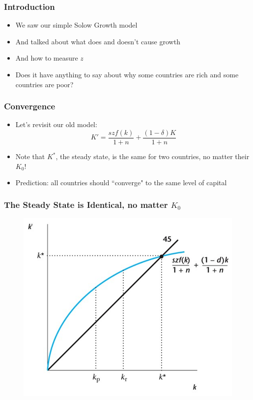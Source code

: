 \documentclass{beamer}
\author{Trevor S. Gallen}
\date{}
\begin{document}
\renewcommand*{\inserttotalframenumber}{\pageref{lastframe}}



\begin{frame}
\titlepage
\end{frame}

\begin{frame}
\frametitle[alignment=center]{Introduction}
\begin{itemize}
\item We saw our simple Solow Growth model
\bigskip
\item And talked about what does and doesn't cause growth
\bigskip
\item And how to measure $z$
\bigskip
\item Does it have anything to say about why some countries are rich and some countries are poor?
\end{itemize}
\end{frame}

\begin{frame}
\frametitle[alignment=center]{Convergence}
\begin{itemize}
\item Let's revisit our old model:
$$K'=\frac{szf(k)}{1+n}+\frac{(1-\delta)K}{1+n}$$
\item Note that $K^*$, the steady state, is the same for two countries, no matter their $K_0$!
\bigskip
\item Prediction:  all countries should ``converge" to the same level of capital
\end{itemize}
\end{frame}

\begin{frame}
\frametitle[alignment=center]{The Steady State is Identical, no matter $K_0$}
\begin{figure}
\centering
\includegraphics[scale=0.5]{Figures/W_Fig_8pt1.png}
\end{figure}
\end{frame}
\end{document}
